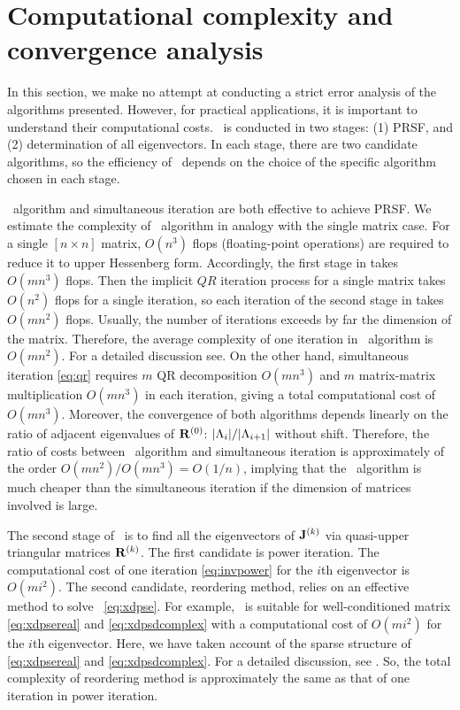 \section{Computational complexity and convergence analysis}
\label{sect:error}

In this section, we make no attempt at conducting a strict error analysis of
the algorithms presented. However, for practical applications,
it is important to understand their computational costs.
\Ped\ is conducted in two stages: (1) {PRSF},
and (2) determination of all
eigenvectors. In each stage, there are two candidate algorithms, so the
efficiency of \ped\ depends on the choice of the specific algorithm
chosen in each stage.

\Psd\ algorithm and simultaneous iteration are both effective to achieve
PRSF. We estimate the complexity of \psd\ algorithm in analogy
with the single matrix case.
For a single $[n\!\times\! n]$ matrix, $O(n^3)$
flops (floating-point operations) are required
to reduce it to upper Hessenberg form.
Accordingly, the first stage in
 takes $O(mn^3)$ flops.
Then the implicit $QR$ iteration process for a single matrix
takes $O(n^2)$ flops for
a single iteration, so each iteration of the second stage in
 takes $O(mn^2)$ flops.
Usually, the number of iterations exceeds by far the
dimension of the matrix. Therefore,  the average complexity of one
iteration in \psd\ algorithm is $O(mn^2)$. For a detailed discussion
see.
On the other hand, simultaneous iteration
\eqref{eq:qr} requires
$m$ QR decomposition $O(mn^{3})$ and $m$ matrix-matrix multiplication
$O(mn^{3})$ in each iteration, giving a total computational cost of
$O(mn^{3})$. {Moreover, the convergence of both algorithms} depends
linearly on the ratio of adjacent eigenvalues of $\mathbf{R}^{(0)}$:
$|\Lambda_{i}|/|\Lambda_{i+1}|$  without shift.
Therefore,
the ratio of costs between \psd\ algorithm and simultaneous iteration
is approximately of the order $O(mn^2)/O(mn^3) = O(1/n)$,
implying that the \psd\ algorithm is much cheaper than the
simultaneous iteration if the dimension of matrices involved is large.

The second stage of \ped\ is to find all the eigenvectors of
$\mathbf{J}^{(k)}$ via quasi-upper triangular matrices $\mathbf{R}^{(k)}$. The
first candidate is power iteration.
The computational cost of one iteration \eqref{eq:invpower} for the $i$th
eigenvector is $O(mi^{2})$. The second candidate, reordering method,
relies on an effective method to solve \pse\ \eqref{eq:xdpse}. For
example, \Gepp\ is suitable
for well-conditioned matrix \eqref{eq:xdpsereal} and
\eqref{eq:xdpsdcomplex} with a computational cost of $O(mi^{2})$
for the $i$th eigenvector. Here, we have taken account of
the sparse structure of \eqref{eq:xdpsereal} and
\eqref{eq:xdpsdcomplex}. For a detailed discussion, see .
So, the total complexity of reordering method is approximately the same as
that of one iteration in power iteration.

